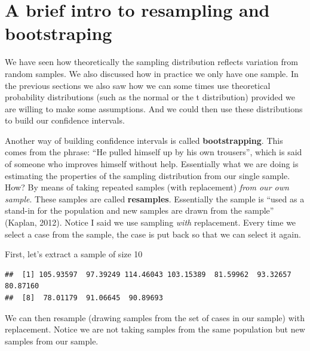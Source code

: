 \documentclass[
]{book}
\newenvironment{Shaded}{\begin{snugshade}}{\end{snugshade}}
\newcommand{\DecValTok}[1]{\textcolor[rgb]{0.00,0.00,0.81}{#1}}
\newcommand{\FunctionTok}[1]{\textcolor[rgb]{0.00,0.00,0.00}{#1}}
\newcommand{\NormalTok}[1]{#1}
\newcommand{\OtherTok}[1]{\textcolor[rgb]{0.56,0.35,0.01}{#1}}
\newcommand{\SpecialCharTok}[1]{\textcolor[rgb]{0.00,0.00,0.00}{#1}}
\begin{document}
\hypertarget{a-brief-intro-to-resampling-and-bootstraping}{%
\section{A brief intro to resampling and bootstraping}\label{a-brief-intro-to-resampling-and-bootstraping}}

We have seen how theoretically the sampling distribution reflects variation from random samples. We also discussed how in practice we only have one sample. In the previous sections we also saw how we can some times use theoretical probability distributions (such as the normal or the t distribution) provided we are willing to make some assumptions. And we could then use these distributions to build our confidence intervals.

Another way of building confidence intervals is called \textbf{bootstrapping}. This comes from the phrase: ``He pulled himself up by his own trousers'', which is said of someone who improves himself without help. Essentially what we are doing is estimating the properties of the sampling distribution from our single sample. How? By means of taking repeated samples (with replacement) \emph{from our own sample}. These samples are called \textbf{resamples}. Essentially the sample is ``used as a stand-in for the population and new samples are drawn from the sample'' (Kaplan, 2012). Notice I said we use sampling \emph{with} replacement. Every time we select a case from the sample, the case is put back so that we can select it again.

First, let's extract a sample of size 10

\begin{Shaded}
\end{Shaded}

\begin{verbatim}
##  [1] 105.93597  97.39249 114.46043 103.15389  81.59962  93.32657  80.87160
##  [8]  78.01179  91.06645  90.89693
\end{verbatim}

We can then resample (drawing samples from the set of cases in our sample) with replacement. Notice we are not taking samples from the same population but new samples from our sample.
\end{document}
